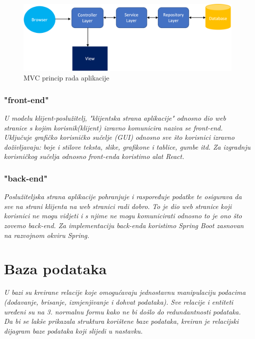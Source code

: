 			\begin{figure}[H]
			\centering
			\includegraphics[width=\textwidth]{slike/mvc.png}
			\caption{MVC princip rada aplikacije}
			\label{fig:my_label}
		     \end{figure}
		
					\subsubsection{"front-end"}
					\textit{	U modelu klijent-poslužitelj, "klijentska strana aplikacije" odnosno dio web stranice s kojim korisnik(klijent) izravno komunicira naziva se front-end. Uključuje grafičko korisničko sučelje (GUI) odnosno sve što korisnici izravno doživljavaju: boje i stilove teksta, slike, grafikone i tablice, gumbe itd. Za izgradnju korisničkog sučelja odnosno front-enda koristimo alat React. }
					\bigskip 
					
					\subsubsection{"back-end"}
					\textit{	Poslužiteljska strana aplikacije pohranjuje i raspoređuje podatke te osigurava da sve na strani klijenta na web stranici radi dobro. To je dio web stranice koji korisnici ne mogu vidjeti i s njime ne mogu komunicirati odnosno to je ono što zovemo back-end. Za implementaciju back-enda koristimo Spring Boot zasnovan na razvojnom okviru Spring. }
				
	\newpage
	

		
		
		
		\section{Baza podataka}
		
		\textit{U bazi su kreirane relacije koje omogućavaju jednostavnu manipulaciju podacima (dodavanje, brisanje, izmjenjivanje i dohvat podataka). Sve relacije i entiteti uređeni su na 3. normalnu formu kako ne bi došlo do redundantnosti podataka. Da bi se lakše prikazala struktura korištene baze podataka, kreiran je relacijski dijagram baze podataka koji slijedi u nastavku. }
		

